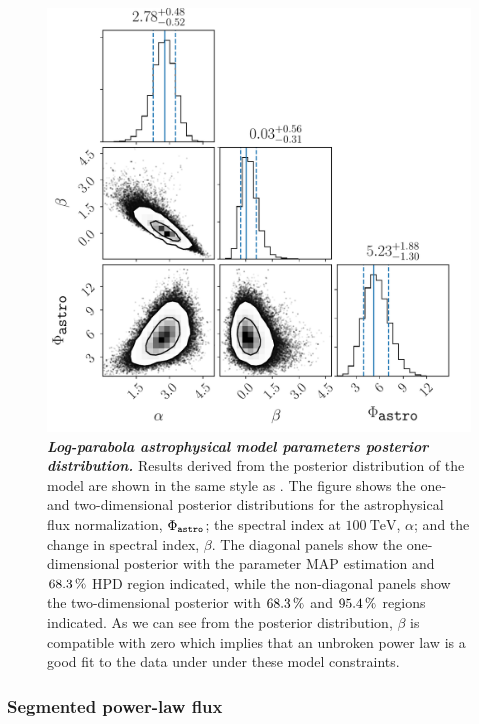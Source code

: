 \begin{figure}
	\centering
	\includegraphics[width=\linewidth]{figures/hese_paper/lppl}
	\internallinenumbers
	\caption{\textbf{\textit{Log-parabola astrophysical model parameters posterior distribution.}}
		Results derived from the posterior distribution of the model are shown in the same style as .
		The figure shows the one- and two-dimensional posterior distributions for the astrophysical flux normalization, $\Phi_\texttt{astro}$; the spectral index at $\SI{100}\TeV$, $\alpha$; and the change in spectral index, $\beta$.
		The diagonal panels show the one-dimensional posterior with the parameter MAP estimation and $\SI{68.3}\percent$ HPD region indicated, while the non-diagonal panels show the two-dimensional posterior with $\SI{68.3}\percent$ and $\SI{95.4}\percent$ regions indicated.
		As we can see from the posterior distribution, $\beta$ is compatible with zero which implies that an unbroken power law is a good fit to the data under under these model constraints.}\label{fig:log_parabola_powerlaw_corner}
\end{figure}


\subsubsection{Segmented power-law flux\label{sec:unfolding}}

